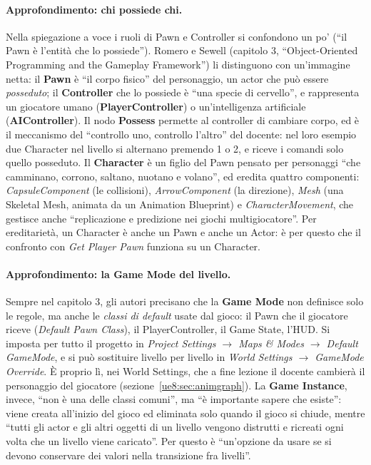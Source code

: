 \paragraph{Approfondimento: chi possiede chi.} Nella spiegazione a voce i ruoli di Pawn
e Controller si confondono un po' (``il Pawn è l'entità che lo possiede''). Romero e
Sewell (capitolo 3, ``Object-Oriented Programming and the Gameplay Framework'') li
distinguono con un'immagine netta: il \textbf{Pawn} è ``il corpo fisico'' del
personaggio, un actor che può essere \emph{posseduto}; il \textbf{Controller} che lo
possiede è ``una specie di cervello'', e rappresenta un giocatore umano
(\textbf{PlayerController}) o un'intelligenza artificiale (\textbf{AIController}). Il
nodo \textbf{Possess} permette al controller di cambiare corpo, ed è il meccanismo del
``controllo uno, controllo l'altro'' del docente: nel loro esempio due Character nel
livello si alternano premendo 1 o 2, e riceve i comandi solo quello posseduto. Il
\textbf{Character} è un figlio del Pawn pensato per personaggi ``che camminano, corrono,
saltano, nuotano e volano'', ed eredita quattro componenti: \emph{CapsuleComponent} (le
collisioni), \emph{ArrowComponent} (la direzione), \emph{Mesh} (una Skeletal Mesh,
animata da un Animation Blueprint) e \emph{CharacterMovement}, che gestisce anche
``replicazione e predizione nei giochi multigiocatore''. Per ereditarietà, un Character è
anche un Pawn e anche un Actor: è per questo che il confronto con \emph{Get Player Pawn}
funziona su un Character.

\paragraph{Approfondimento: la Game Mode del livello.} Sempre nel capitolo 3, gli autori
precisano che la \textbf{Game Mode} non definisce solo le regole, ma anche le
\emph{classi di default} usate dal gioco: il Pawn che il giocatore riceve
(\emph{Default Pawn Class}), il PlayerController, il Game State, l'HUD. Si imposta per
tutto il progetto in \emph{Project Settings $\rightarrow$ Maps \& Modes $\rightarrow$
Default GameMode}, e si può sostituire livello per livello in \emph{World Settings
$\rightarrow$ GameMode Override}. È proprio lì, nei World Settings, che a fine lezione il
docente cambierà il personaggio del giocatore (sezione~\ref{ue8:sec:animgraph}). La
\textbf{Game Instance}, invece, ``non è una delle classi comuni'', ma ``è importante
sapere che esiste'': viene creata all'inizio del gioco ed eliminata solo quando il gioco
si chiude, mentre ``tutti gli actor e gli altri oggetti di un livello vengono distrutti e
ricreati ogni volta che un livello viene caricato''. Per questo è ``un'opzione da usare
se si devono conservare dei valori nella transizione fra livelli''.


